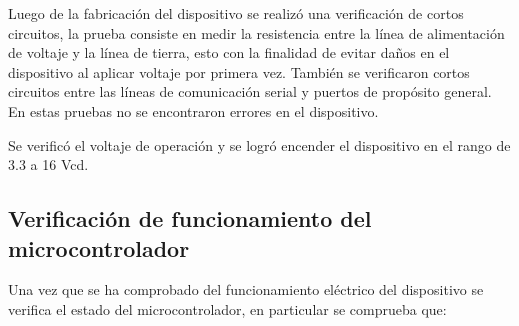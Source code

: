 Luego de la fabricaci\'on del dispositivo se realiz\'o una verificaci\'on de cortos circuitos, la prueba consiste en medir la resistencia entre la l\'inea de alimentaci\'on de voltaje y la l\'inea de tierra, esto con la finalidad de evitar da\~nos en el dispositivo al aplicar voltaje por primera vez. Tambi\'en se verificaron cortos circuitos entre las l\'ineas de comunicaci\'on serial y puertos de prop\'osito general. En estas pruebas no se encontraron errores en el dispositivo. 


Se verific\'o el voltaje de operaci\'on y se logr\'o encender el dispositivo en el rango de 3.3 a 16 Vcd.





\subsection{Verificaci\'on de funcionamiento del microcontrolador}

Una vez que se ha comprobado del funcionamiento el\'ectrico del dispositivo se verifica el estado del microcontrolador, en particular se comprueba que: 

